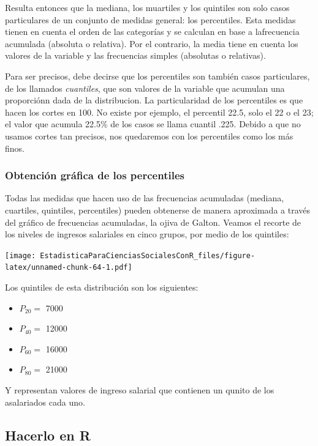 \documentclass[]{book}
\providecommand{\tightlist}{%
  \setlength{\itemsep}{0pt}\setlength{\parskip}{0pt}}
\begin{document}
Resulta entonces que la mediana, los muartiles y los quintiles son solo casos particulares de un conjunto de medidas general: los percentiles. Esta medidas tienen en cuenta el orden de las categorías y se calculan en base a lafrecuencia acumulada (absoluta o relativa). Por el contrario, la media tiene en cuenta los valores de la variable y las frecuencias simples (absolutas o relativas).

Para ser precisos, debe decirse que los percentiles son también casos particulares, de los llamados \emph{cuantiles}, que son valores de la variable que acumulan una proporciónn dada de la distribucion. La particularidad de los percentiles es que hacen los cortes en 100. No existe por ejemplo, el percentil 22.5, solo el 22 o el 23; el valor que acumula 22.5\% de los casos se llama cuantil .225. Debido a que no usamos cortes tan precisos, nos quedaremos con los percentiles como los más finos.

\hypertarget{obtenciuxf3n-gruxe1fica-de-los-percentiles}{%
\subsubsection{Obtención gráfica de los percentiles}\label{obtenciuxf3n-gruxe1fica-de-los-percentiles}}

Todas las medidas que hacen uso de las frecuencias acumuladas (mediana, cuartiles, quintiles, percentiles) pueden obtenerse de manera aproximada a través del gráfico de frecuencias acumuladas, la ojiva de Galton. Veamos el recorte de los niveles de ingresos salariales en cinco grupos, por medio de los quintiles:

\texttt{[image: EstadisticaParaCienciasSocialesConR\_files/figure-latex/unnamed-chunk-64-1.pdf]}

Los quintiles de esta distribución son los siguientes:

\begin{itemize}
\tightlist
\item
  \(P_{20} =\) 7000
\item
  \(P_{40} =\) 12000
\item
  \(P_{60} =\) 16000
\item
  \(P_{80} =\) 21000
\end{itemize}

Y representan valores de ingreso salarial que contienen un qunito de los asalariados cada uno.

\hypertarget{hacerlo-en-r}{%
\subsection{Hacerlo en R}\label{hacerlo-en-r}}
\end{document}
